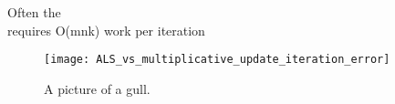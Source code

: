 \documentclass[12pt]{article}
\begin{document}
Often the \\
requires O(mnk) work per iteration


\begin{figure}[h!]
  \caption{A picture of a gull.}
  \centering
    \texttt{[image: ALS\_vs\_multiplicative\_update\_iteration\_error]}
\end{figure}
\end{document}
